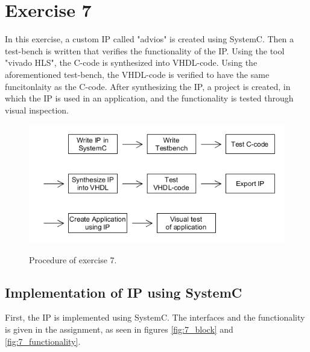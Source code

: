 
\chapter{Exercise 7}

In this exercise, a custom IP called "advios" is created using SystemC. Then a test-bench is written that verifies the functionality of the IP. Using the tool "vivado HLS", the C-code is synthesized into VHDL-code. Using the aforementioned test-bench, the VHDL-code is verified to have the same funcitonlaity as the C-code.
After synthesizing the IP, a project is created, in which the IP is used in an application, and the functionality is tested through visual inspection.

\begin{figure}[b]
	\centering
	{\includegraphics[scale=0.5]{Images/2_7_procedure.png}}\\[0.5cm]
	\label{fig:7_procedure}
	\caption{Procedure of exercise 7.}
\end{figure}

\FloatBarrier

\section{Implementation of IP using SystemC}
First, the IP is implemented using SystemC. The interfaces and the functionality is given in the assignment, as seen in figures \ref{fig:7_block} and \ref{fig:7_functionality}.

